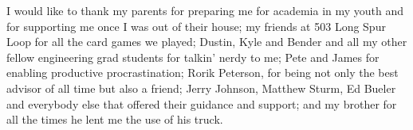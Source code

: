 I would like to thank my parents for preparing me for academia in my youth and
for supporting me once I was out of their house; my friends at 503 Long Spur
Loop for all the card games we played; Dustin, Kyle and Bender and all my other
fellow engineering grad students for talkin' nerdy to me; Pete and James for
enabling productive procrastination; Rorik Peterson, for being not only the best
advisor of all time but also a friend; Jerry Johnson, Matthew Sturm, Ed Bueler
and everybody else that offered their guidance and support; and my brother
for all the times he lent me the use of his truck.
